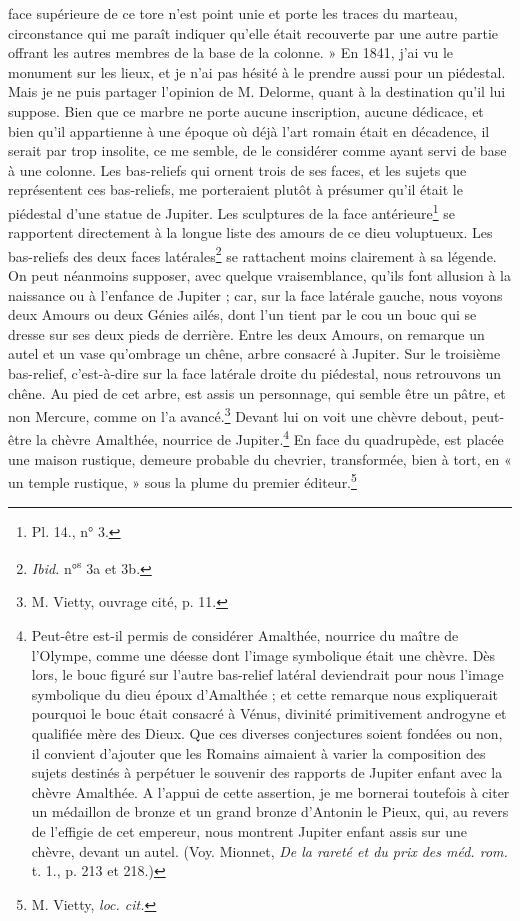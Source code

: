 \documentclass{article}
\begin{document}
face supérieure de ce tore n'est point unie et porte les traces du marteau, circonstance qui me paraît indiquer qu'elle était recouverte par une autre partie offrant les autres membres de la base de la colonne. » En 1841, j'ai vu le monument sur les lieux, et je n'ai pas hésité à le prendre aussi pour un piédestal. Mais je ne puis partager l'opinion de M. Delorme, quant à la destination qu'il lui suppose. Bien que ce marbre ne porte aucune inscription, aucune dédicace, et bien qu'il appartienne à une époque où déjà l'art romain était en décadence, il serait par trop insolite, ce me semble, de le considérer comme ayant servi de base à une colonne. Les bas-reliefs qui ornent trois de ses faces, et les sujets que représentent ces bas-reliefs, me porteraient plutôt à présumer qu'il était le piédestal d'une statue de Jupiter. Les sculptures de la face antérieure\footnote{Pl. 14., n° 3.} se rapportent directement à la longue liste des amours de ce dieu voluptueux. Les bas-reliefs des deux faces latérales\footnote{\emph{Ibid.} n°\textsuperscript{s} 3a et 3b.} se rattachent moins clairement à sa légende. On peut néanmoins supposer, avec quelque vraisemblance, qu'ils font allusion à la naissance ou à l'enfance de Jupiter ; car, sur la face latérale gauche, nous voyons deux Amours ou deux Génies ailés, dont l'un tient par le cou un bouc qui se dresse sur ses deux pieds de derrière. Entre les deux Amours, on remarque un autel et un vase qu'ombrage un chêne, arbre consacré à Jupiter. Sur le troisième bas-relief, c'est-à-dire sur la face latérale droite du piédestal, nous retrouvons un chêne. Au pied de cet arbre, est assis un personnage, qui semble être un pâtre, et non Mercure, comme on l'a avancé.\footnote{M. Vietty, ouvrage cité, p. 11.} Devant lui on voit une chèvre debout, peut-être la chèvre Amalthée, nourrice de Jupiter.\footnote{Peut-être est-il permis de considérer Amalthée, nourrice du maître de l'Olympe, comme une déesse dont l'image symbolique était une chèvre. Dès lors, le bouc figuré sur l'autre bas-relief latéral deviendrait pour nous l'image symbolique du dieu époux d'Amalthée ; et cette remarque nous expliquerait pourquoi le bouc était consacré à Vénus, divinité primitivement androgyne et qualifiée mère des Dieux. Que ces diverses conjectures soient fondées ou non, il convient d'ajouter que les Romains aimaient à varier la composition des sujets destinés à perpétuer le souvenir des rapports de Jupiter enfant avec la chèvre Amalthée. A l'appui de cette assertion, je me bornerai toutefois à citer un médaillon de bronze et un grand bronze d'Antonin le Pieux, qui, au revers de l'effigie de cet empereur, nous montrent Jupiter enfant assis sur une chèvre, devant un autel. (Voy. Mionnet, \emph{De la rareté et du prix des méd. rom.} t. 1., p. 213 et 218.)} En face du quadrupède, est placée une maison rustique, demeure probable du chevrier, transformée, bien à tort, en « un temple rustique, » sous la plume du premier éditeur.\footnote{M. Vietty, \emph{loc. cit.}}
\end{document}
